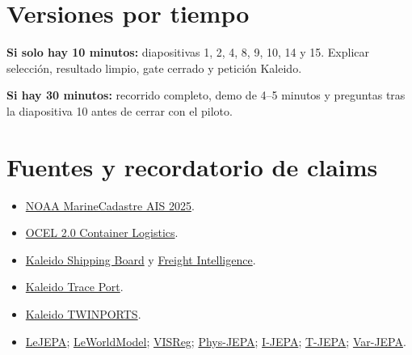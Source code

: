 \documentclass[11pt,a4paper]{article}
\begin{document}
\section{Versiones por tiempo}
\textbf{Si solo hay 10 minutos:} diapositivas 1, 2, 4, 8, 9, 10, 14 y 15. Explicar
selección, resultado limpio, gate cerrado y petición Kaleido.

\textbf{Si hay 30 minutos:} recorrido completo, demo de 4--5 minutos y preguntas tras la
diapositiva 10 antes de cerrar con el piloto.

\section{Fuentes y recordatorio de claims}
\begin{itemize}
\item \href{https://coast.noaa.gov/htdata/CMSP/AISDataHandler/2025/}{NOAA MarineCadastre AIS 2025}.
\item \href{https://doi.org/10.5281/zenodo.18373888}{OCEL 2.0 Container Logistics}.
\item \href{https://www.kaleidologistics.com/en/productos-ktech/shipping-board/}{Kaleido Shipping Board} y
\href{https://www.kaleidologistics.com/en/productos-ktech/freight-intelligence/}{Freight Intelligence}.
\item \href{https://www.kaleidologistics.com/en/productos-ktech/trace-port/}{Kaleido Trace Port}.
\item \href{https://www.kaleidologistics.com/es/proyectos-financiados/el-proyecto-twinports-despega-en-el-puerto-de-vigo-comienzan-los-trabajos-para-crear-el-gemelo-digital-de-la-terminal-portuaria-de-kaleido/}{Kaleido TWINPORTS}.
\item \href{https://arxiv.org/abs/2511.08544}{LeJEPA};
\href{https://arxiv.org/abs/2603.19312}{LeWorldModel};
\href{https://arxiv.org/abs/2606.02572}{VISReg};
\href{https://arxiv.org/abs/2606.16076}{Phys-JEPA};
\href{https://arxiv.org/abs/2301.08243}{I-JEPA};
\href{https://arxiv.org/abs/2410.05016}{T-JEPA};
\href{https://arxiv.org/abs/2603.20111}{Var-JEPA}.
\end{itemize}

\begin{center}
\end{center}
\end{document}
